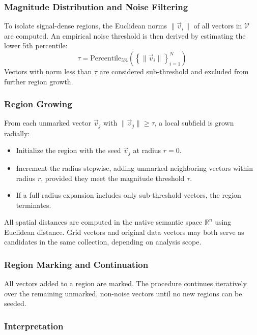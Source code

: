 \documentclass{article}
\begin{document}
\subsubsection{Magnitude Distribution and Noise Filtering}

To isolate signal-dense regions, the Euclidean norms \( \| \vec{v}_i \| \) of all vectors in \( \mathcal{V} \) are computed. An empirical noise threshold is then derived by estimating the lower 5th percentile:
\[
\tau = \text{Percentile}_{5\%} \left( \left\{ \| \vec{v}_i \| \right\}_{i=1}^N \right)
\]
Vectors with norm less than \( \tau \) are considered sub-threshold and excluded from further region growth.

\subsubsection{Region Growing}

From each unmarked vector \( \vec{v}_j \) with \( \| \vec{v}_j \| \geq \tau \), a local subfield is grown radially:

\begin{itemize}
    \item Initialize the region with the seed \( \vec{v}_j \) at radius \( r = 0 \).
    \item Increment the radius stepwise, adding unmarked neighboring vectors within radius \( r \), provided they meet the magnitude threshold \( \tau \).
    \item If a full radius expansion includes only sub-threshold vectors, the region terminates.
\end{itemize}

All spatial distances are computed in the native semantic space \( \mathbb{R}^n \) using Euclidean distance. Grid vectors and original data vectors may both serve as candidates in the same collection, depending on analysis scope.

\subsubsection{Region Marking and Continuation}

All vectors added to a region are marked. The procedure continues iteratively over the remaining unmarked, non-noise vectors until no new regions can be seeded.

\subsubsection{Interpretation}
\end{document}
